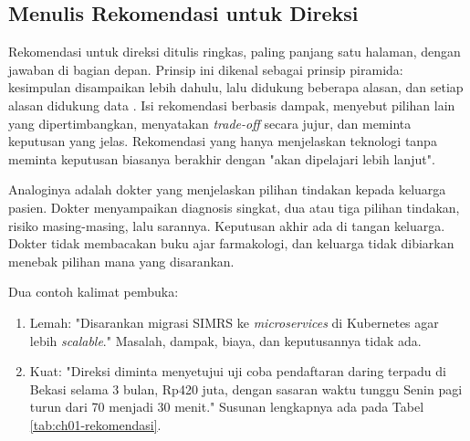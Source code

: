 \subsection{Menulis Rekomendasi untuk Direksi}

Rekomendasi untuk direksi ditulis ringkas, paling panjang satu halaman, dengan jawaban
di bagian depan. Prinsip ini dikenal sebagai prinsip piramida: kesimpulan disampaikan
lebih dahulu, lalu didukung beberapa alasan, dan setiap alasan didukung data
\cite{c01-minto2009}. Isi rekomendasi berbasis dampak, menyebut pilihan lain yang
dipertimbangkan, menyatakan \textit{trade-off} secara jujur, dan meminta keputusan yang
jelas. Rekomendasi yang hanya menjelaskan teknologi tanpa meminta keputusan biasanya
berakhir dengan "akan dipelajari lebih lanjut".

Analoginya adalah dokter yang menjelaskan pilihan tindakan kepada keluarga pasien.
Dokter menyampaikan diagnosis singkat, dua atau tiga pilihan tindakan, risiko
masing-masing, lalu sarannya. Keputusan akhir ada di tangan keluarga. Dokter tidak
membacakan buku ajar farmakologi, dan keluarga tidak dibiarkan menebak pilihan mana
yang disarankan.

Dua contoh kalimat pembuka:
\begin{enumerate}
  \item Lemah: "Disarankan migrasi SIMRS ke \textit{microservices} di Kubernetes agar
        lebih \textit{scalable}." Masalah, dampak, biaya, dan keputusannya tidak ada.
  \item Kuat: "Direksi diminta menyetujui uji coba pendaftaran daring terpadu di Bekasi
        selama 3 bulan, Rp420 juta, dengan sasaran waktu tunggu Senin pagi turun dari
        70 menjadi 30 menit." Susunan lengkapnya ada pada Tabel
        \ref{tab:ch01-rekomendasi}.
\end{enumerate}

